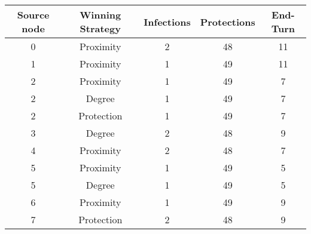 \documentclass[results.tex]{subfiles}
\begin{document}
    \begin{center}
        \begin{tabular}{| c || c | c | c | c |}
            \hline
            {\bfseries Source node} & {\bfseries Winning Strategy} & {\bfseries Infections} & {\bfseries Protections}
            & {\bfseries End-Turn}
            \\  %
            \hline\hline
            0                       & Proximity                    & 2                      & 48                      & 11                   \\
            \hline
            1                       & Proximity                    & 1                      & 49                      & 11                   \\
            \hline
            2                       & Proximity                    & 1                      & 49                      & 7                    \\
            \hline
            2                       & Degree                       & 1                      & 49                      & 7                    \\
            \hline
            2                       & Protection                   & 1                      & 49                      & 7                    \\
            \hline
            3                       & Degree                       & 2                      & 48                      & 9                    \\
            \hline
            4                       & Proximity                    & 2                      & 48                      & 7                    \\
            \hline
            5                       & Proximity                    & 1                      & 49                      & 5                    \\
            \hline
            5                       & Degree                       & 1                      & 49                      & 5                    \\
            \hline
            6                       & Proximity                    & 1                      & 49                      & 9                    \\
            \hline
            7                       & Protection                   & 2                      & 48                      & 9                    \\

\end{tabular}
\end{center}
\end{document}
